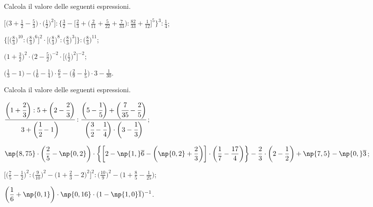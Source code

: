 \begin{esercizio}[\Ast]%
 Calcola il valore delle seguenti espressioni.
\begin{enumeratea}
\spazielenx
\item $\displaystyle{\bigg[\bigg(3+\frac{1}{2}-\frac{5}{3}\bigg)\cdot
\bigg(\frac{1}{2}\bigg)^{2}\bigg]:\bigg\{\frac{3}{2}-\bigg[\frac{2}{3}+\bigg(\frac{2}{11}+
\frac{5}{22}+\frac{7}{33}\bigg):\frac{82}{33}+\frac{1}{12}\bigg]^{5}\bigg\}^{3}:\frac{1}{4}}$;
\item $\displaystyle{\bigg\{\bigg[\bigg(\frac{8}{3}\bigg)^{10}:\bigg(\frac{8}{3}\bigg)^{6}\bigg]^{2}\cdot
\bigg[\bigg(\frac{8}{3}\bigg)^{8}:\bigg(\frac{8}{3}\bigg)^{3}\bigg]\bigg\}:\bigg(\frac{8}{3}\bigg)^{11}}$;
\item $\displaystyle{\bigg(1+\frac{3}{2}\bigg)^{2}\cdot
\bigg(2-\frac{5}{2}\bigg)^{-2}\cdot
\bigg[\bigg(\frac{1}{2}\bigg)^{2}\bigg]^{-2}}$;
\item $\displaystyle{\bigg(\frac{1}{3}-1\bigg)-\bigg(\frac{1}{6}-\frac{1}{4}\bigg)\cdot
{\frac{6}{5}}-\bigg(\frac{2}{9}-\frac{1}{5}\bigg)\cdot 3-\frac{1}{30}}$.
\end{enumeratea}
\end{esercizio}

\begin{esercizio}[\Ast]%
 Calcola il valore delle seguenti espressioni.
\begin{enumeratea}
\spazielenx
\item $\displaystyle{\cfrac{\bigg(1+\cfrac{2}{3}\bigg):5+\bigg(2-\cfrac{2}{3}\bigg)}{3+\bigg(\cfrac{1}{2}-1\bigg)}:
\frac{\bigg(5-\cfrac{1}{5}\bigg)+\bigg(\cfrac{7}{35}-\cfrac{2}{5}\bigg)}{\bigg(\cfrac{3}{2}-\cfrac{1}{4}\bigg)\cdot
\bigg(3-\cfrac{1}{3}\bigg)}}$;
\item $\displaystyle{\np{8,75}\cdot\bigg(\frac{2}{5}-\np{0,2}\bigg)\cdot\bigg\{\bigg[2-\np{1,}\overline{{6}}-\bigg(\np{0,2}+\frac{2}{3}\bigg)\bigg]
\cdot\bigg(\frac{1}{7}-\frac{17}{4}\bigg)\bigg\}-\frac{2}{3}\cdot\bigg(2-\frac{1}{2}\bigg)+\np{7,5}-\np{0,}\overline{{3}}}$;
\item $\displaystyle{\bigg[\bigg(\frac{7}{5}-\frac{1}{2}\bigg)^{2}:\bigg(\frac{9}{10}\bigg)^{2}-
\bigg(1+\frac{2}{3}-2\bigg)^{2}\bigg]^{2}:\bigg(\frac{10}{9}\bigg)^{2}-\bigg(1+\frac{8}{5}-\frac{1}{25}\bigg)}$;
\item $\displaystyle{\bigg(\frac{1}{6}+\np{0,1}\bigg)\cdot \np{0,16}\cdot
(1-\np{1,0}\overline{{1}})^{-1}}$.
\end{enumeratea}
\end{esercizio}

